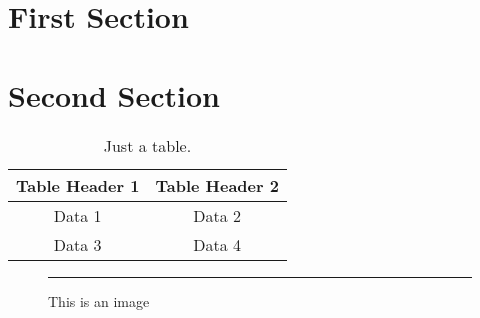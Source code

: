 \documentclass{article}
\begin{document}
\tableofcontents

\newpage

\section{First Section}
\lipsum[1-2]

\section{Second Section}
\lipsum[3-4]

\listoftables

\begin{table}[h!]
  \centering
  \begin{tabular}{|c|c|}
    \hline
    Table Header 1 & Table Header 2 \\
    \hline
    Data 1 & Data 2 \\
    Data 3 & Data 4 \\
    \hline
  \end{tabular}
  \caption{Just a table.}
\end{table}

\listoffigures

\begin{figure}
  \centering
  \rule{4cm}{3cm} %
  \caption{This is an image}
\end{figure}
\end{document}
